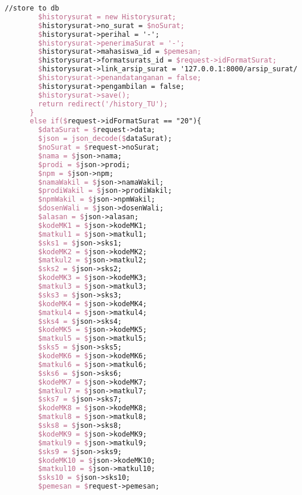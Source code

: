 \begin{lstlisting}[language=tex,basicstyle=\tiny,caption=HistorysuratController.php]
        //store to db
        $historysurat = new Historysurat;
        $historysurat->no_surat = $noSurat;
        $historysurat->perihal = '-';
        $historysurat->penerimaSurat = '-';
        $historysurat->mahasiswa_id = $pemesan;
        $historysurat->formatsurats_id = $request->idFormatSurat;
        $historysurat->link_arsip_surat = '127.0.0.1:8000/arsip_surat/' . $noSurat. '_' . $npm . '_surat_perwakilan_perwalian_9mk.pdf';
        $historysurat->penandatanganan = false;
        $historysurat->pengambilan = false;
        $historysurat->save();
        return redirect('/history_TU');
      }
      else if($request->idFormatSurat == "20"){
        $dataSurat = $request->data;
        $json = json_decode($dataSurat);
        $noSurat = $request->noSurat;
        $nama = $json->nama;
        $prodi = $json->prodi;
        $npm = $json->npm;
        $namaWakil = $json->namaWakil;
        $prodiWakil = $json->prodiWakil;
        $npmWakil = $json->npmWakil;
        $dosenWali = $json->dosenWali;
        $alasan = $json->alasan;
        $kodeMK1 = $json->kodeMK1;
        $matkul1 = $json->matkul1;
        $sks1 = $json->sks1;
        $kodeMK2 = $json->kodeMK2;
        $matkul2 = $json->matkul2;
        $sks2 = $json->sks2;
        $kodeMK3 = $json->kodeMK3;
        $matkul3 = $json->matkul3;
        $sks3 = $json->sks3;
        $kodeMK4 = $json->kodeMK4;
        $matkul4 = $json->matkul4;
        $sks4 = $json->sks4;
        $kodeMK5 = $json->kodeMK5;
        $matkul5 = $json->matkul5;
        $sks5 = $json->sks5;
        $kodeMK6 = $json->kodeMK6;
        $matkul6 = $json->matkul6;
        $sks6 = $json->sks6;
        $kodeMK7 = $json->kodeMK7;
        $matkul7 = $json->matkul7;
        $sks7 = $json->sks7;
        $kodeMK8 = $json->kodeMK8;
        $matkul8 = $json->matkul8;
        $sks8 = $json->sks8;
        $kodeMK9 = $json->kodeMK9;
        $matkul9 = $json->matkul9;
        $sks9 = $json->sks9;
        $kodeMK10 = $json->kodeMK10;
        $matkul10 = $json->matkul10;
        $sks10 = $json->sks10;
        $pemesan = $request->pemesan;


\end{lstlisting}
